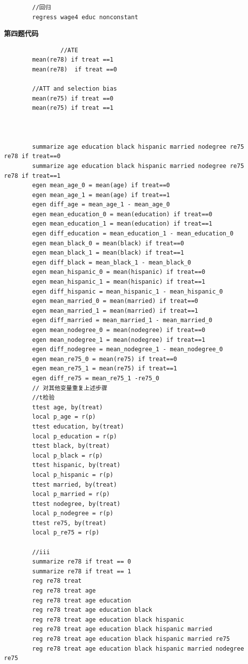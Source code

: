 \documentclass[a4paper]{ctexart}
\theoremstyle{remark}
\begin{document}
\begin{itemize}
\begin{lstlisting}
        //回归
        regress wage4 educ nonconstant
    \end{lstlisting}

{\fontsize{8pt}{12pt}\selectfont \textbf{第四题代码}}
    \begin{lstlisting}
                //ATE
        mean(re78) if treat ==1 
        mean(re78)  if treat ==0

        //ATT and selection bias
        mean(re75) if treat ==0
        mean(re75) if treat ==1 



        summarize age education black hispanic married nodegree re75 re78 if treat==0
        summarize age education black hispanic married nodegree re75 re78 if treat==1
        egen mean_age_0 = mean(age) if treat==0
        egen mean_age_1 = mean(age) if treat==1
        egen diff_age = mean_age_1 - mean_age_0
        egen mean_education_0 = mean(education) if treat==0
        egen mean_education_1 = mean(education) if treat==1
        egen diff_education = mean_education_1 - mean_education_0
        egen mean_black_0 = mean(black) if treat==0
        egen mean_black_1 = mean(black) if treat==1
        egen diff_black = mean_black_1 - mean_black_0
        egen mean_hispanic_0 = mean(hispanic) if treat==0
        egen mean_hispanic_1 = mean(hispanic) if treat==1
        egen diff_hispanic = mean_hispanic_1 - mean_hispanic_0
        egen mean_married_0 = mean(married) if treat==0
        egen mean_married_1 = mean(married) if treat==1
        egen diff_married = mean_married_1 - mean_married_0
        egen mean_nodegree_0 = mean(nodegree) if treat==0
        egen mean_nodegree_1 = mean(nodegree) if treat==1
        egen diff_nodegree = mean_nodegree_1 - mean_nodegree_0
        egen mean_re75_0 = mean(re75) if treat==0
        egen mean_re75_1 = mean(re75) if treat==1
        egen diff_re75 = mean_re75_1 -re75_0
        // 对其他变量重复上述步骤
        //t检验
        ttest age, by(treat)
        local p_age = r(p)
        ttest education, by(treat)
        local p_education = r(p)
        ttest black, by(treat)
        local p_black = r(p)
        ttest hispanic, by(treat)
        local p_hispanic = r(p)
        ttest married, by(treat)
        local p_married = r(p)
        ttest nodegree, by(treat)
        local p_nodegree = r(p)
        ttest re75, by(treat)
        local p_re75 = r(p)

        //iii
        summarize re78 if treat == 0
        summarize re78 if treat == 1
        reg re78 treat
        reg re78 treat age
        reg re78 treat age education
        reg re78 treat age education black
        reg re78 treat age education black hispanic
        reg re78 treat age education black hispanic married
        reg re78 treat age education black hispanic married re75
        reg re78 treat age education black hispanic married nodegree re75
    \end{lstlisting}


\end{itemize}
\end{document}
